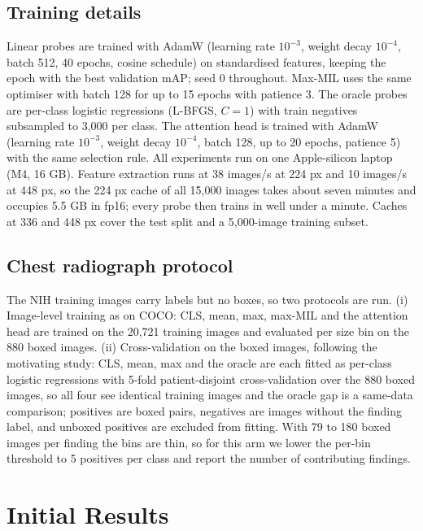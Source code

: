 \documentclass[10pt,letterpaper,twocolumn]{article}
\begin{document}
\subsection{Training details}
Linear probes are trained with AdamW (learning rate $10^{-3}$, weight decay $10^{-4}$, batch
512, 40 epochs, cosine schedule) on standardised features, keeping the epoch with the best
validation mAP; seed 0 throughout. Max-MIL uses the same optimiser with batch 128 for up to 15
epochs with patience 3. The oracle probes are per-class logistic regressions (L-BFGS, $C=1$)
with train negatives subsampled to 3,000 per class. The attention head is trained with AdamW
(learning rate $10^{-3}$, weight decay $10^{-4}$, batch 128, up to 20 epochs, patience 5) with
the same selection rule. All experiments run on one Apple-silicon laptop (M4, 16 GB). Feature
extraction runs at 38 images/s at 224 px and 10 images/s at 448 px, so the 224 px cache of all
15,000 images takes about seven minutes and occupies 5.5 GB in fp16; every probe then trains
in well under a minute. Caches at 336 and 448 px cover the test split and a 5,000-image
training subset.

\subsection{Chest radiograph protocol}
\label{sec:cxr-protocol}
The NIH training images carry labels but no boxes, so two protocols are run. (i) Image-level
training as on COCO: CLS, mean, max, max-MIL and the attention head are trained on the 20,721
training images and evaluated per size bin on the 880 boxed images. (ii) Cross-validation on
the boxed images, following the motivating study: CLS, mean, max and the oracle are each
fitted as per-class logistic regressions with 5-fold patient-disjoint cross-validation over
the 880 boxed images, so all four see identical training images and the oracle gap is a
same-data comparison; positives are boxed pairs, negatives are images without the finding
label, and unboxed positives are excluded from fitting. With 79 to 180 boxed images per
finding the bins are thin, so for this arm we lower the per-bin threshold to 5 positives per
class and report the number of contributing findings.

\section{Initial Results}
\label{sec:results}
\end{document}
